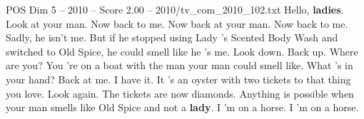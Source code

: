 \begin{textsample}{POS Dim 5 – 2010 – Score 2.00 – 2010/tv\_com\_2010\_102.txt}  \label{ex:f5_pos_071}
Hello, \textbf{ladies}.
Look at your man.
Now back to me.
Now back at your man.
Now back to me.
Sadly, he isn't me.
But if he stopped using Lady 's Scented Body Wash and switched to Old Spice, he could smell like he 's me.
Look down.
Back up.
Where are you?
You 're on a boat with the man your man could smell like.
What 's in your hand?
Back at me.
I have it.
It 's an oyster with two tickets to that thing you love.
Look again.
The tickets are now diamonds.
Anything is possible when your man smells like Old Spice and not a \textbf{lady}.
I 'm on a horse.
I 'm on a horse.

\end{textsample}
